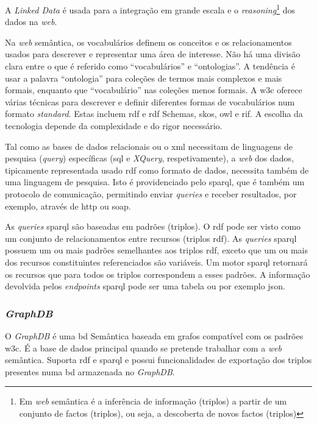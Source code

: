 A \textit{Linked Data} é usada para a integração em grande escala e o \textit{reasoning}\footnote{Em \textit{web} semântica é a inferência de informação (triplos) a partir de um conjunto de factos (triplos), ou seja, a descoberta de novos factos (triplos)} dos dados na \textit{web}.

Na \textit{web} semântica, os vocabulários definem os conceitos e os relacionamentos usados para descrever e representar uma área de interesse. Não há uma divisão clara entre o que é referido como ``vocabulários'' e ``ontologias''. A tendência é usar a palavra ``ontologia'' para coleções de termos mais complexos e mais formais, enquanto que ``vocabulário'' nas coleções menos formais. A \acrshort{w3c} oferece várias técnicas para descrever e definir diferentes formas de vocabulários num formato \textit{standard}. Estas incluem \acrshort{rdf} e \acrshort{rdf} Schemas, \acrshort{skos}, \acrshort{owl} e \acrshort{rif}. A escolha da tecnologia depende da complexidade e do rigor necessário.

Tal como as bases de dados relacionais ou o \acrshort{xml} necessitam de linguagens de pesquisa (\textit{query}) específicas (\acrshort{sql} e \textit{XQuery}, respetivamente), a \textit{web} dos dados, tipicamente representada usado \acrshort{rdf} como formato de dados, necessita também de uma linguagem de pesquisa. Isto é providenciado pelo \acrshort{sparql}, que é também um protocolo de comunicação, permitindo enviar \textit{queries} e receber resultados, por exemplo, através de \acrshort{http} ou \acrshort{soap}.

As \textit{queries} \acrshort{sparql} são baseadas em padrões (triplos). O \acrshort{rdf} pode ser visto como um conjunto de relacionamentos entre recursos (triplos \acrshort{rdf}). As \textit{queries} \acrshort{sparql} possuem um ou mais padrões semelhantes aos triplos \acrshort{rdf}, exceto que um ou mais dos recursos constituintes referenciados são variáveis. Um motor \acrshort{sparql} retornará os recursos que para todos os triplos correspondem a esses padrões. A informação devolvida pelos \textit{endpoints} \acrshort{sparql} pode ser uma tabela ou por exemplo \acrshort{json}.

\subsubsection{\textit{GraphDB}}

O \textit{GraphDB} é uma \acrfull{bd} Semântica baseada em grafos compatível com os padrões \acrshort{w3c}. É a base de dados principal quando se pretende trabalhar com a \textit{web} semântica. Suporta \acrshort{rdf} e \acrshort{sparql} e possui funcionalidades de exportação dos triplos presentes numa \acrshort{bd} armazenada no \textit{GraphDB}.

